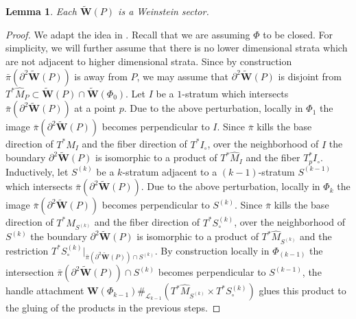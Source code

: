 \documentclass[a4paper,12pt, twoside, pdftex]{amsart}
\newtheorem{lemma}[dummy]{Lemma}
\theoremstyle{definition}
\numberwithin{equation}{section}
\newcommand{\del}{\partial}
\newcommand{\cL}{\mathcal{L}}
\newcommand{\bfW}{\mathbf{W}}
\begin{document}
\begin{lemma} \label{lem:W-sector}
Each
$\widetilde{\bfW}(P)$
is a Weinstein sector.
\end{lemma}
\begin{proof}
We adapt the idea in
\cite[Example 1.33]{GPS2}.
Recall that
we are assuming
$\Phi$
to be closed.
For simplicity,
we will further assume that
there is no lower dimensional strata
which are not adjacent to higher dimensional strata.
Since by construction
$\bar{\pi}(\del^2 \widetilde{\bfW}(P))$
is away from
$P$,
we may assume that
$\del^2 \widetilde{\bfW}(P)$
is disjoint from
$T^* \widehat{M}_P
\subset
\widetilde{\bfW}(P)
\cap
\widetilde{\bfW}(\Phi_0)$.
Let
$I$
be a $1$-stratum
which intersects
$\bar{\pi}(\del^2 \widetilde{\bfW}(P))$
at a point
$p$.
Due to the above perturbation,
locally in
$\Phi_1$
the image
$\bar{\pi}(\del^2 \widetilde{\bfW}(P))$
becomes perpendicular to
$I$.
Since
$\bar{\pi}$
kills
the base direction of
$T^* \widehat{M}_I$
and
the fiber direction of
$T^* I_\circ$,
over the neighborhood of
$I$
the boundary
$\del^2 \widetilde{\bfW}(P)$
is isomorphic to a product of
$T^* \widehat{M}_I$
and
the fiber
$T^*_p I_\circ$.
Inductively,
let
$S^{(k)}$
be a $k$-stratum adjacent to a $(k-1)$-stratum
$S^{(k-1)}$
which intersects
$\bar{\pi}(\del^2 \widetilde{\bfW}(P))$.
Due to the above perturbation,
locally in
$\Phi_k$
the image
$\bar{\pi}(\del^2 \widetilde{\bfW}(P))$
becomes perpendicular to
$S^{(k)}$.
Since
$\bar{\pi}$
kills
the base direction of
$T^* \widehat{M}_{S^{(k)}}$
and
the fiber direction of
$T^* S^{(k)}_\circ$,
over the neighborhood of
$S^{(k)}$
the boundary
$\del^2 \widetilde{\bfW}(P)$
is isomorphic to a product of
$T^* \widehat{M}_{S^{(k)}}$
and
the restriction
$T^* S^{(k)}_\circ |_{\bar{\pi}(\del^2 \widetilde{\bfW}(P)) \cap S^{(k)}}$.
By construction locally in
$\Phi_{(k-1)}$
the intersection
$\bar{\pi}(\del^2 \widetilde{\bfW}(P)) \cap S^{(k)}$
becomes perpendicular to
$S^{(k-1)}$,
the handle attachment
$\bfW(\Phi_{k-1}) \#_{\cL_{k-1}} (T^* \widehat{M}_{S^{(k)}} \times T^* S^{(k)}_\circ)$
glues this product to the gluing of the products in the previous steps.


\end{proof}
\end{document}
